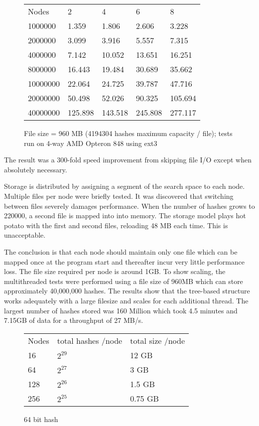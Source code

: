 \begin{figure} 
        \caption{File size = 960 MB  (4194304 hashes maximum capacity / file); tests run on 4-way AMD Opteron 848 using ext3}
\begin{tabular}{lllll}
Nodes &       2 & 4 & 6 & 8 \\
1000000 &       1.359 & 1.806 & 2.606 & 3.228 \\
2000000 &  3.099 & 3.916 & 5.557 & 7.315 \\
4000000 &  7.142 & 10.052 & 13.651 & 16.251 \\
8000000 &  16.443 & 19.484 & 30.689 & 35.662 \\
10000000 & 22.064 & 24.725 & 39.787 & 47.716 \\ 
20000000 & 50.498 & 52.026 & 90.325 & 105.694 \\
40000000 & 125.898 & 143.518 & 245.808 & 277.117\\
\end{tabular}
\end{figure}

The result was a 300-fold speed improvement from skipping file I/O except when absolutely
necessary. 

Storage is distributed by assigning a segment of the search space to each node. 
Multiple files per node were briefly tested. It was discovered that switching between files
severely damages performance. When the number of hashes grows to 220000, 
a second file is mapped into into memory. The storage model plays hot potato with the first
and second files, reloading 48 MB each time. This is unacceptable. 

The conclusion is that each node should maintain only one file which can be mapped once at
the program start and thereafter incur very little performance loss. The file size required
per node is around 1GB. To show scaling, the multithreaded tests were performed using a file size of
960MB which can store approximately 40,000,000 hashes. The results show that the tree-based
structure works adequately with a large filesize and scales for each additional thread. The largest
number of hashes stored was 160 Million which took 4.5 minutes and 7.15GB of data for a throughput
of 27 MB/s. 

\begin{figure} 
        \caption{64 bit hash}
\begin{tabular}{lll}
Nodes    &       total hashes /node       &     total size /node \\ 
16    &    $2^{29}$         &                 12   GB \\ 
64    &    $2^{27}$         &                  3   GB \\
128   &    $2^{26}$         &                 1.5  GB \\
256   &    $2^{25}$         &                 0.75 GB \\
\end{tabular}
\end{figure}

